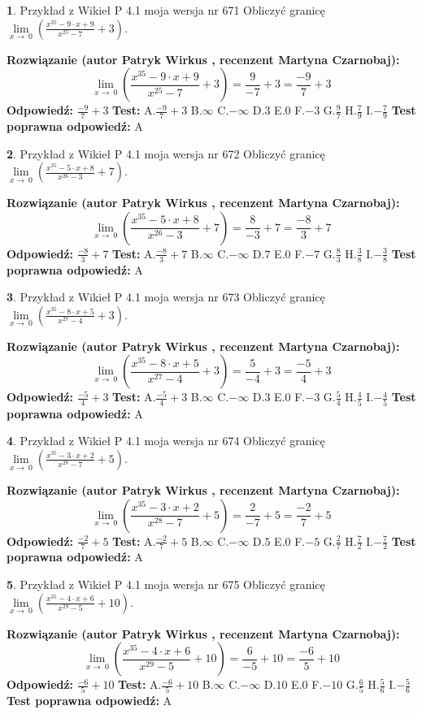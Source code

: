\documentclass[12pt, a4paper]{article}
\theoremstyle{definition} %
\newtheorem{zad}{}
\newcommand{\zadStart}[1]{\begin{zad}#1\newline}
\newcommand{\zadStop}{\end{zad}}
\newcommand{\rozwStart}[2]{\noindent \textbf{Rozwiązanie (autor #1 , recenzent #2): }\newline}
\newcommand{\rozwStop}{\newline}
\newcommand{\odpStart}{\noindent \textbf{Odpowiedź:}\newline}
\newcommand{\odpStop}{\newline}
\newcommand{\testStart}{\noindent \textbf{Test:}\newline}
\newcommand{\testStop}{\newline}
\newcommand{\kluczStart}{\noindent \textbf{Test poprawna odpowiedź:}\newline}
\newcommand{\kluczStop}{\newline}
\begin{document}
\zadStart{Przykład z Wikieł P 4.1 moja wersja nr 671}
Obliczyć granicę $\lim\limits_{x\to\ 0}(\frac{x^{35}-9 \cdot x +9}{x^{25}-7}+3)$.
\zadStop
\rozwStart{Patryk Wirkus}{Martyna Czarnobaj}
$$\lim\limits_{x\to\ 0}(\frac{x^{35}-9 \cdot x +9}{x^{25}-7}+3)=\frac{9}{-7}+3=\frac{-9}{7}+3$$
\rozwStop
\odpStart
$\frac{-9}{7}+3$
\odpStop
\testStart
A.$\frac{-9}{7}+3$
B.$\infty$
C.$-\infty$
D.$3$
E.$0$
F.$-3$
G.$\frac{9}{7}$
H.$\frac{7}{9}$
I.$-\frac{7}{9}$
\testStop
\kluczStart
A
\kluczStop



\zadStart{Przykład z Wikieł P 4.1 moja wersja nr 672}
Obliczyć granicę $\lim\limits_{x\to\ 0}(\frac{x^{35}-5 \cdot x +8}{x^{26}-3}+7)$.
\zadStop
\rozwStart{Patryk Wirkus}{Martyna Czarnobaj}
$$\lim\limits_{x\to\ 0}(\frac{x^{35}-5 \cdot x +8}{x^{26}-3}+7)=\frac{8}{-3}+7=\frac{-8}{3}+7$$
\rozwStop
\odpStart
$\frac{-8}{3}+7$
\odpStop
\testStart
A.$\frac{-8}{3}+7$
B.$\infty$
C.$-\infty$
D.$7$
E.$0$
F.$-7$
G.$\frac{8}{3}$
H.$\frac{3}{8}$
I.$-\frac{3}{8}$
\testStop
\kluczStart
A
\kluczStop



\zadStart{Przykład z Wikieł P 4.1 moja wersja nr 673}
Obliczyć granicę $\lim\limits_{x\to\ 0}(\frac{x^{35}-8 \cdot x +5}{x^{27}-4}+3)$.
\zadStop
\rozwStart{Patryk Wirkus}{Martyna Czarnobaj}
$$\lim\limits_{x\to\ 0}(\frac{x^{35}-8 \cdot x +5}{x^{27}-4}+3)=\frac{5}{-4}+3=\frac{-5}{4}+3$$
\rozwStop
\odpStart
$\frac{-5}{4}+3$
\odpStop
\testStart
A.$\frac{-5}{4}+3$
B.$\infty$
C.$-\infty$
D.$3$
E.$0$
F.$-3$
G.$\frac{5}{4}$
H.$\frac{4}{5}$
I.$-\frac{4}{5}$
\testStop
\kluczStart
A
\kluczStop



\zadStart{Przykład z Wikieł P 4.1 moja wersja nr 674}
Obliczyć granicę $\lim\limits_{x\to\ 0}(\frac{x^{35}-3 \cdot x +2}{x^{28}-7}+5)$.
\zadStop
\rozwStart{Patryk Wirkus}{Martyna Czarnobaj}
$$\lim\limits_{x\to\ 0}(\frac{x^{35}-3 \cdot x +2}{x^{28}-7}+5)=\frac{2}{-7}+5=\frac{-2}{7}+5$$
\rozwStop
\odpStart
$\frac{-2}{7}+5$
\odpStop
\testStart
A.$\frac{-2}{7}+5$
B.$\infty$
C.$-\infty$
D.$5$
E.$0$
F.$-5$
G.$\frac{2}{7}$
H.$\frac{7}{2}$
I.$-\frac{7}{2}$
\testStop
\kluczStart
A
\kluczStop



\zadStart{Przykład z Wikieł P 4.1 moja wersja nr 675}
Obliczyć granicę $\lim\limits_{x\to\ 0}(\frac{x^{35}-4 \cdot x +6}{x^{29}-5}+10)$.
\zadStop
\rozwStart{Patryk Wirkus}{Martyna Czarnobaj}
$$\lim\limits_{x\to\ 0}(\frac{x^{35}-4 \cdot x +6}{x^{29}-5}+10)=\frac{6}{-5}+10=\frac{-6}{5}+10$$
\rozwStop
\odpStart
$\frac{-6}{5}+10$
\odpStop
\testStart
A.$\frac{-6}{5}+10$
B.$\infty$
C.$-\infty$
D.$10$
E.$0$
F.$-10$
G.$\frac{6}{5}$
H.$\frac{5}{6}$
I.$-\frac{5}{6}$
\testStop
\kluczStart
A
\kluczStop
\end{document}
